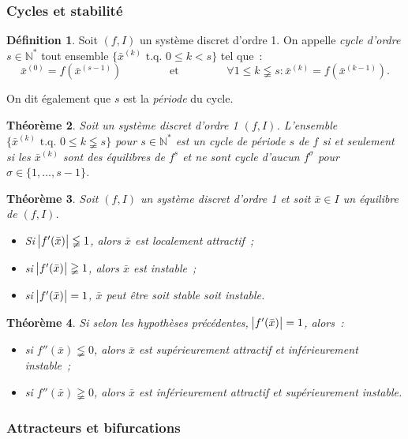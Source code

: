 \documentclass{article}
\newtheorem{thm}{Théorème}[section]
\theoremstyle{definition}
\newtheorem{déf}[thm]{Définition}
\theoremstyle{remark}
\newcommand{\N}{\mathbb N}
\newcommand{\tq}{\text{ t.q. }}
\begin{document}
		\subsubsection{Cycles et stabilité}

	\begin{déf} Soit $(f, I)$ un système discret d'ordre 1. On appelle \textit{cycle d'ordre $s \in \N^*$} tout ensemble $\{\bar x^{(k)} \tq 0 \leq k < s\}$
	tel que~:
	\[\bar x^{(0)} = f(\bar x^{(s-1)}) \qquad\qquad \text{ et } \qquad\qquad \forall 1 \leq k \lneqq s : \bar x^{(k)} = f(\bar x^{(k-1)}).\]

	On dit également que $s$ est la \textit{période} du cycle.
	\end{déf}

	\begin{thm} Soit un système discret d'ordre 1 $(f, I)$. L'ensemble $\{\bar x^{(k)} \tq 0 \leq k \lneqq s\}$ pour $s \in \N^*$ est un cycle de période $s$
	de $f$ si et seulement si les $\bar x^{(k)}$ sont des équilibres de $f^s$ et ne sont cycle d'aucun $f^\sigma$ pour $\sigma \in \{1, \ldots, s-1\}$.
	\end{thm}

	\begin{thm} Soit $(f, I)$ un système discret d'ordre 1 et soit $\bar x \in I$ un équilibre de $(f, I)$.

	\begin{itemize}
		\item Si $\abs {f'(\bar x)} \lneqq 1$, alors $\bar x$ est localement attractif~;
		\item si $\abs {f'(\bar x)} \gneqq 1$, alors $\bar x$ est instable~;
		\item si $\abs {f'(\bar x)} = 1$, $\bar x$ peut être soit stable soit instable.
	\end{itemize}
	\end{thm}

	\begin{thm} Si selon les hypothèses précédentes, $\abs {f'(\bar x)} = 1$, alors~:
	\begin{itemize}
		\item si $f''(\bar x) \lneqq 0$, alors $\bar x$ est supérieurement attractif et inférieurement instable~;
		\item si $f''(\bar x) \gneqq 0$, alors $\bar x$ est inférieurement attractif et supérieurement instable.
	\end{itemize}
	\end{thm}

		\subsubsection{Attracteurs et bifurcations}
\end{document}
